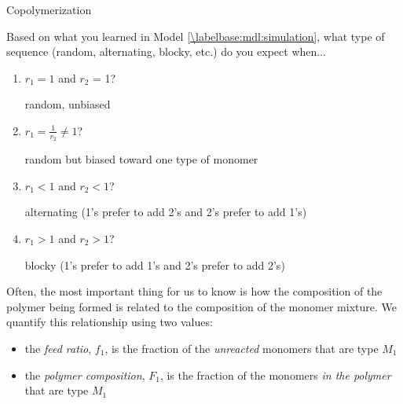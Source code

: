 \begin{activity}{Copolymerization}
\begin{ctqs}
	\question Based on what you learned in Model \ref{\labelbase:mdl:simulation}, what type of sequence (random, alternating, blocky, etc.) do you expect when...
	
		\begin{enumerate}
			\item $r_1 = 1$ and $r_2$ = 1?
			
				\begin{solution}[0.5in]{}
					random, unbiased
				\end{solution}
			
			\item $r_1 = \frac{1}{r_2} \neq 1$?
			
				\begin{solution}[0.5in]{}
					random but biased toward one type of monomer
				\end{solution}
			
			\item $r_1 < 1$ and $r_2 < 1$?
			
				\begin{solution}[0.5in]{}
					alternating (1's prefer to add 2's and 2's prefer to add 1's)
				\end{solution}
			
			\item $r_1 > 1$ and $r_2 > 1$?
			
				\begin{solution}[0.5in]{}
					blocky (1's prefer to add 1's and 2's prefer to add 2's)
				\end{solution}
		\end{enumerate}

\end{ctqs}

\vspace{0.5in}
\begin{model}
	\label{\labelbase:mdl:feedratios}
	
	Often, the most important thing for us to know is how the composition of the polymer being formed is related to the composition of the monomer mixture.  We quantify this relationship using two values:
	\begin{itemize}
		\item the \emph{feed ratio}, $f_1$, is the fraction of the \emph{unreacted} monomers that are type $M_1$
		\item the \emph{polymer composition}, $F_1$, is the fraction of  the monomers \emph{in the polymer} that are type $M_1$
	\end{itemize}
	

\end{model}
\end{activity}
